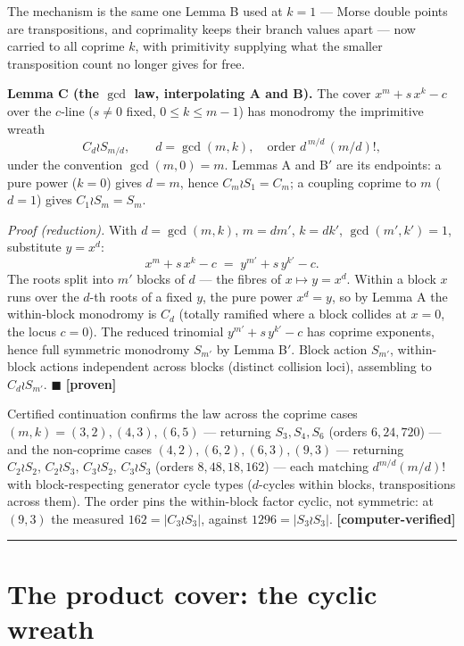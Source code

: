\documentclass[11pt]{article}
\theoremstyle{plain}
\theoremstyle{definition}
\theoremstyle{remark}
\begin{document}
The mechanism is the same one Lemma B used at \(k=1\) --- Morse double points are transpositions, and coprimality keeps their branch values apart --- now carried to all coprime \(k\), with primitivity supplying what the smaller transposition count no longer gives for free.

\textbf{Lemma C (the \(\gcd\) law, interpolating A and B).} The cover \(x^m + s\,x^k - c\) over the \(c\)-line (\(s\neq 0\) fixed, \(0\le k\le m-1\)) has monodromy the imprimitive wreath \[
C_{d}\wr S_{m/d}, \qquad d = \gcd(m,k), \quad \text{order } d^{\,m/d}\,(m/d)!,
\] under the convention \(\gcd(m,0)=m\). Lemmas A and B\('\) are its endpoints: a pure power (\(k=0\)) gives \(d=m\), hence \(C_m\wr S_1 = C_m\); a coupling coprime to \(m\) (\(d=1\)) gives \(C_1\wr S_m = S_m\).

\emph{Proof (reduction).} With \(d=\gcd(m,k)\), \(m=dm'\), \(k=dk'\), \(\gcd(m',k')=1\), substitute \(y=x^d\): \[
x^m + s\,x^k - c \;=\; y^{m'} + s\,y^{k'} - c .
\] The roots split into \(m'\) blocks of \(d\) --- the fibres of \(x\mapsto y=x^d\). Within a block \(x\) runs over the \(d\)-th roots of a fixed \(y\), the pure power \(x^d=y\), so by Lemma A the within-block monodromy is \(C_d\) (totally ramified where a block collides at \(x=0\), the locus \(c=0\)). The reduced trinomial \(y^{m'}+s\,y^{k'}-c\) has coprime exponents, hence full symmetric monodromy \(S_{m'}\) by Lemma B\('\). Block action \(S_{m'}\), within-block actions independent across blocks (distinct collision loci), assembling to \(C_d\wr S_{m'}\). \(\blacksquare\) \textbf{{[}proven{]}}

Certified continuation confirms the law across the coprime cases \((m,k)=(3,2),(4,3),(6,5)\) --- returning \(S_3,S_4,S_6\) (orders \(6,24,720\)) --- and the non-coprime cases \((4,2),(6,2),(6,3),(9,3)\) --- returning \(C_2\wr S_2,\,C_2\wr S_3,\,C_3\wr S_2,\,C_3\wr S_3\) (orders \(8,48,18,162\)) --- each matching \(d^{m/d}(m/d)!\) with block-respecting generator cycle types (\(d\)-cycles within blocks, transpositions across them). The order pins the within-block factor cyclic, not symmetric: at \((9,3)\) the measured \(162=|C_3\wr S_3|\), against \(1296=|S_3\wr S_3|\). \textbf{{[}computer-verified{]}}

\begin{center}\rule{0.5\linewidth}{0.5pt}\end{center}

\hypertarget{the-product-cover-the-cyclic-wreath}{%
\section{The product cover: the cyclic wreath}\label{the-product-cover-the-cyclic-wreath}}
\end{document}
